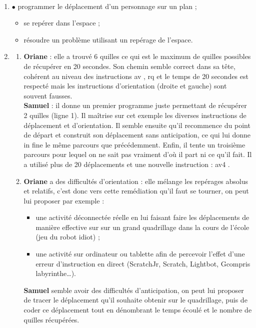 \begin{corrige}
\ \\ [-5mm]
\begin{enumerate}
   \item \textcolor{A2}{$\bullet$} programmer le déplacement d’un personnage sur un plan ;
   \begin{itemize}
      \item se repérer dans l'espace ;
      \item résoudre un problème utilisant un repérage de l'espace.
   \end{itemize}
   \item 
   \begin{enumerate}
      \item {\bf Oriane} : elle a trouvé 6 quilles ce qui est le maximum de quilles possibles de récupérer en 20 secondes. Son chemin semble correct dans sa tête, cohérent au niveau des instructions \og av \fg{}, \og rq \fg{} et le temps de 20 secondes est respecté mais les instructions d'orientation (droite et gauche) sont souvent fausses. \\
      {\bf Samuel} : il donne un premier programme juste permettant de récupérer 2 quilles (ligne 1). Il maîtrise sur cet exemple les diverses instructions de déplacement et d'orientation. Il semble ensuite qu'il recommence du point de départ et construit son déplacement sans anticipation, ce qui lui donne in fine le même parcours que précédemment. Enfin, il tente un troisième parcours pour lequel on ne sait pas vraiment d'où il part ni ce qu'il fait. Il a utilisé plus de 20 déplacements et une nouvelle instruction : \og av4 \fg.
      \item {\bf Oriane} a des difficultés d'orientation : elle mélange les repérages absolus et relatifs, c'est donc vers cette remédiation qu'il faut se tourner, on peut lui proposer par exemple :
      \begin{itemize}
         \item une activité déconnectée réelle en lui faisant faire les déplacements de manière effective sur sur un grand quadrillage dans la cours de l'école (jeu du robot idiot) ; 
        \item une activité sur ordinateur ou tablette afin de percevoir l'effet d'une erreur d'instruction en direct (ScratchJr, Scratch, Lightbot, Gcompris labyrinthe\dots).
     \end{itemize}
     {\bf Samuel} semble avoir des difficultés d'anticipation, on peut lui proposer de tracer le déplacement qu'il souhaite obtenir sur le quadrillage, puis de coder ce déplacement tout en dénombrant le temps écoulé et le nombre de quilles récupérées.
   \end{enumerate}
\end{enumerate}
\end{corrige}



